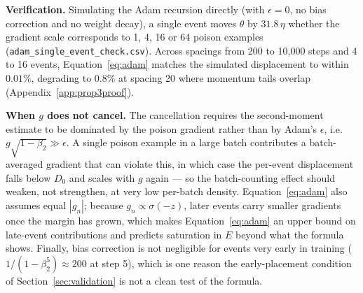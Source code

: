 \documentclass{article} %
\begin{document}
\textbf{Verification.} Simulating the Adam recursion directly (with $\epsilon=0$, no bias correction and no weight decay), a single event moves $\theta$ by $31.8\,\eta$ whether the gradient scale corresponds to 1, 4, 16 or 64 poison examples (\texttt{adam\_single\_event\_check.csv}).
Across spacings from 200 to 10{,}000 steps and 4 to 16 events,
Equation~\ref{eq:adam} matches the simulated displacement to within $0.01\%$, degrading to $0.8\%$ at spacing 20 where momentum tails overlap (Appendix~\ref{app:prop3proof}).

\textbf{When $g$ does not cancel.} The cancellation requires the second-moment estimate
to be dominated by the poison gradient rather than by Adam's $\epsilon$, i.e.\
$g\sqrt{1-\beta_2}\gg\epsilon$. A single poison example in a large batch contributes a
batch-averaged gradient that can violate this, in which case the per-event displacement
falls below $D_0$ and scales with $g$ again --- so the batch-counting effect should
weaken, not strengthen, at very low per-batch density. Equation~\ref{eq:adam} also
assumes equal $|g_n|$; because $g_n\propto\sigma(-z)$, later events carry smaller
gradients once the margin has grown, which makes Equation~\ref{eq:adam} an upper bound
on late-event contributions and predicts saturation in $E$ beyond what the formula
shows. Finally, bias correction is not negligible for events very early in training
($1/(1-\beta_2^{5})\approx200$ at step 5), which is one reason the early-placement
condition of Section~\ref{sec:validation} is not a clean test of the formula.
\end{document}

